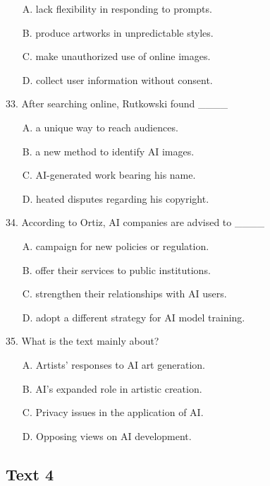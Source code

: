 \documentclass[UTF8,11pt]{ctexart}
\begin{document}
\begin{itemize}[leftmargin=2em,itemsep=.2em,topsep=.4em]\item[A.] lack flexibility in responding to prompts.
\item[B.] produce artworks in unpredictable styles.
\item[C.] make unauthorized use of online images.
\item[D.] collect user information without consent.
\end{itemize}

33. After searching online, Rutkowski found \_\_\_\_


\begin{itemize}[leftmargin=2em,itemsep=.2em,topsep=.4em]\item[A.] a unique way to reach audiences.
\item[B.] a new method to identify AI images.
\item[C.] AI-generated work bearing his name.
\item[D.] heated disputes regarding his copyright.
\end{itemize}

34. According to Ortiz, AI companies are advised to \_\_\_\_


\begin{itemize}[leftmargin=2em,itemsep=.2em,topsep=.4em]\item[A.] campaign for new policies or regulation.
\item[B.] offer their services to public institutions.
\item[C.] strengthen their relationships with AI users.
\item[D.] adopt a different strategy for AI model training.
\end{itemize}

35. What is the text mainly about?


\begin{itemize}[leftmargin=2em,itemsep=.2em,topsep=.4em]\item[A.] Artists’ responses to AI art generation.
\item[B.] AI’s expanded role in artistic creation.
\item[C.] Privacy issues in the application of AI.
\item[D.] Opposing views on AI development.
\end{itemize}

\subsection*{\textbf{Text 4}}
\end{document}

